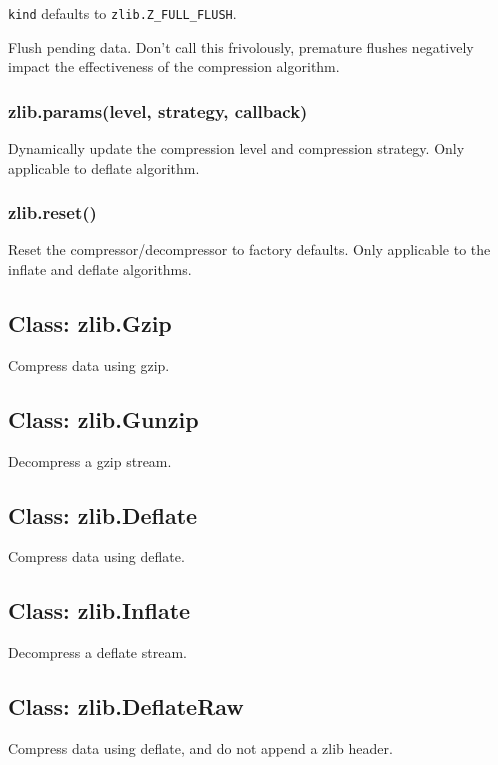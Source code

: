 \texttt{kind} defaults to \texttt{zlib.Z\_FULL\_FLUSH}.

Flush pending data. Don't call this frivolously, premature flushes
negatively impact the effectiveness of the compression algorithm.

\subsubsection{zlib.params(level, strategy, callback)}

Dynamically update the compression level and compression strategy. Only
applicable to deflate algorithm.

\subsubsection{zlib.reset()}

Reset the compressor/decompressor to factory defaults. Only applicable
to the inflate and deflate algorithms.

\subsection{Class: zlib.Gzip}

Compress data using gzip.

\subsection{Class: zlib.Gunzip}

Decompress a gzip stream.

\subsection{Class: zlib.Deflate}

Compress data using deflate.

\subsection{Class: zlib.Inflate}

Decompress a deflate stream.

\subsection{Class: zlib.DeflateRaw}

Compress data using deflate, and do not append a zlib header.

